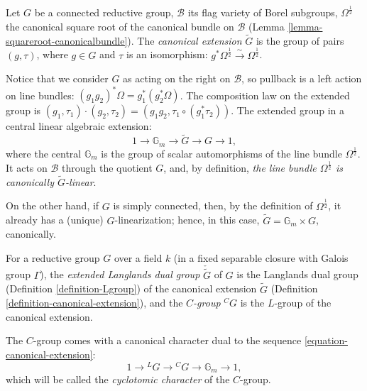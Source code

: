 \begin{definition}
 \label{definition-canonical-extension}
Let $G$ be a connected reductive group, $\mathcal B$ its flag variety of Borel subgroups, $\Omega^\frac{1}{2}$ the canonical square root of the canonical bundle on $\mathcal B$ (Lemma \ref{lemma-squareroot-canonicalbundle}). The {\it canonical extension} $\tilde G$ is the group of pairs $(g,\tau)$, where $g\in G$ and $\tau$ is an isomorphism: $g^*\Omega^\frac{1}{2}\xrightarrow\sim \Omega^\frac{1}{2}$.
\end{definition}

\begin{remark}
 \label{remark-canonical-extension}
Notice that we consider $G$ as acting on the right on $\mathcal B$, so pullback is a left action on line bundles: $(g_1g_2)^*\Omega = g_1^*(g_2^*\Omega)$. The composition law on the extended group is $(g_1,\tau_1)\cdot (g_2,\tau_2) = (g_1g_2, \tau_1\circ(g_1^*\tau_2))$. The extended group in a central linear algebraic extension:
\begin{equation}
\label{equation-canonical-extension} 1\to \mathbb G_m \to \tilde G \to G \to 1,
\end{equation}
where the central $\mathbb G_m$ is the group of scalar automorphisms of the line bundle $\Omega^\frac{1}{2}$. It acts on $\mathcal B$ through the quotient $G$, and, by definition, \emph{the line bundle $\Omega^\frac{1}{2}$ is canonically $\tilde G$-linear}.

On the other hand, if $G$ is simply connected, then, by the definition of $\Omega^\frac{1}{2}$, it already has a (unique) $G$-linearization; hence, in this case, $\tilde G = \mathbb G_m \times G$, canonically.
\end{remark}


\begin{definition}
 \label{definition-C-group}
For a reductive group $G$ over a field $k$ (in a fixed separable closure with Galois group $\Gamma$), the {\it extended Langlands dual group} $\check{\tilde G}$ of $G$ is the Langlands dual group (Definition \ref{definition-Lgroup}) of the canonical extension $\tilde G$ (Definition \ref{definition-canonical-extension}), and the {\it $C$-group} ${^CG}$ is the $L$-group of the canonical extension. 

The $C$-group comes with a canonical character dual to the sequence \eqref{equation-canonical-extension}:
\begin{equation}
\label{equation-cyclotomic-character} 
1\to {^LG} \to {^CG} \to \mathbb G_m \to 1,
\end{equation}
which will be called the {\it cyclotomic character} of the $C$-group.
\end{definition}

